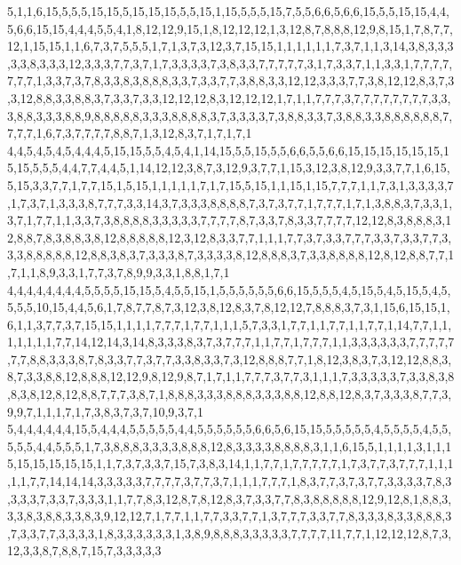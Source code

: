 5,1,1,6,15,5,5,5,15,15,5,15,15,15,5,5,15,1,15,5,5,5,15,7,5,5,6,6,5,6,6,15,5,5,15,15,4,4,5,6,6,15,15,4,4,4,5,5,4,1,8,12,12,9,15,1,8,12,12,12,1,3,12,8,7,8,8,8,12,9,8,15,1,7,8,7,7,12,1,15,15,1,1,6,7,3,7,5,5,5,1,7,1,3,7,3,12,3,7,15,15,1,1,1,1,1,1,7,3,7,1,1,3,14,3,8,3,3,3,3,3,8,3,3,3,12,3,3,3,7,7,3,7,1,7,3,3,3,3,7,3,8,3,3,7,7,7,7,7,3,1,7,3,3,7,1,1,3,3,1,7,7,7,7,7,7,7,1,3,3,7,3,7,8,3,3,8,3,8,8,8,3,3,7,3,3,7,7,3,8,8,3,3,12,12,3,3,3,7,7,3,8,12,12,8,3,7,3,3,12,8,8,3,3,8,8,3,7,3,3,7,3,3,12,12,12,8,3,12,12,12,1,7,1,1,7,7,7,3,7,7,7,7,7,7,7,7,3,3,3,8,8,3,3,3,8,8,9,8,8,8,8,8,3,3,3,8,8,8,8,3,7,3,3,3,3,7,3,8,8,3,3,7,3,8,8,3,3,8,8,8,8,8,8,7,7,7,7,1,6,7,3,7,7,7,7,8,8,7,1,3,12,8,3,7,1,7,1,7,1
4,4,5,4,5,4,5,4,4,4,5,15,15,5,5,4,5,4,1,14,15,5,5,15,5,5,6,6,5,5,6,6,15,15,15,15,15,15,15,15,5,5,5,4,4,7,7,4,4,5,1,14,12,12,3,8,7,3,12,9,3,7,7,1,15,3,12,3,8,12,9,3,3,7,7,1,6,15,5,15,3,3,7,7,1,7,7,15,1,5,15,1,1,1,1,1,7,1,7,15,5,15,1,1,15,1,15,7,7,7,1,1,7,3,1,3,3,3,3,7,1,7,3,7,1,3,3,3,8,7,7,7,3,3,14,3,7,3,3,3,8,8,8,8,7,3,7,3,7,7,1,7,7,7,1,7,1,3,8,8,3,7,3,3,1,3,7,1,7,7,1,1,3,3,7,3,8,8,8,8,3,3,3,3,3,7,7,7,7,8,7,3,3,7,8,3,3,7,7,7,7,12,12,8,3,8,8,8,3,12,8,8,7,8,3,8,8,3,8,12,8,8,8,8,8,12,3,12,8,3,3,7,7,1,1,1,7,7,3,7,3,3,7,7,7,3,3,7,3,3,7,7,3,3,3,8,8,8,8,8,12,8,8,3,8,3,7,3,3,3,8,7,3,3,3,3,8,12,8,8,8,3,7,3,3,8,8,8,8,12,8,12,8,8,7,7,1,7,1,1,8,9,3,3,1,7,7,3,7,8,9,9,3,3,1,8,8,1,7,1
4,4,4,4,4,4,4,4,5,5,5,5,15,15,5,4,5,5,15,1,5,5,5,5,5,5,6,6,15,5,5,5,4,5,15,5,4,5,15,5,4,5,5,5,5,10,15,4,4,5,6,1,7,8,7,7,8,7,3,12,3,8,12,8,3,7,8,12,12,7,8,8,8,3,7,3,1,15,6,15,15,1,6,1,1,3,7,7,3,7,15,15,1,1,1,1,7,7,7,1,7,7,1,1,1,5,7,3,3,1,7,7,1,1,7,7,1,1,7,7,1,14,7,7,1,1,1,1,1,1,1,7,7,14,12,14,3,14,8,3,3,3,8,3,7,3,7,7,7,1,1,7,7,1,7,7,7,1,1,3,3,3,3,3,3,7,7,7,7,7,7,7,8,8,3,3,3,8,7,8,3,3,7,7,3,7,7,3,3,8,3,3,7,3,12,8,8,8,7,7,1,8,12,3,8,3,7,3,12,12,8,8,3,8,7,3,3,8,8,12,8,8,8,12,12,9,8,12,9,8,7,1,7,1,1,7,7,7,3,7,7,3,1,1,1,7,3,3,3,3,3,7,3,3,8,3,8,8,3,8,12,8,12,8,8,7,7,7,3,8,7,1,8,8,8,3,3,3,8,8,8,3,3,3,8,8,12,8,8,12,8,3,7,3,3,3,8,7,7,3,9,9,7,1,1,1,7,1,7,3,8,3,7,3,7,10,9,3,7,1
5,4,4,4,4,4,4,15,5,4,4,4,5,5,5,5,5,4,4,5,5,5,5,5,5,6,6,5,6,15,15,5,5,5,5,5,4,5,5,5,5,4,5,5,5,5,5,4,4,5,5,5,1,7,3,8,8,8,3,3,3,3,8,8,8,12,8,3,3,3,3,8,8,8,8,3,1,1,6,15,5,1,1,1,1,3,1,1,15,15,15,15,15,15,1,1,7,3,7,3,3,7,15,7,3,8,3,14,1,1,7,7,1,7,7,7,7,7,1,7,3,7,7,3,7,7,7,1,1,1,1,1,7,7,14,14,14,3,3,3,3,3,7,7,7,7,3,7,7,3,7,1,1,1,7,7,7,1,8,3,7,7,3,7,3,7,7,3,3,3,3,7,8,3,3,3,3,7,3,3,7,3,3,3,1,1,7,7,8,3,12,8,7,8,12,8,3,7,3,3,7,7,8,3,8,8,8,8,8,12,9,12,8,1,8,8,3,3,3,8,3,8,8,3,3,8,3,9,12,12,7,1,7,7,1,1,7,7,3,3,7,7,1,3,7,7,7,3,3,7,7,8,3,3,3,8,3,3,8,8,8,3,7,3,3,7,7,3,3,3,3,1,8,3,3,3,3,3,3,1,3,8,9,8,8,8,3,3,3,3,3,7,7,7,7,11,7,7,1,12,12,12,8,7,3,12,3,3,8,7,8,8,7,15,7,3,3,3,3,3
